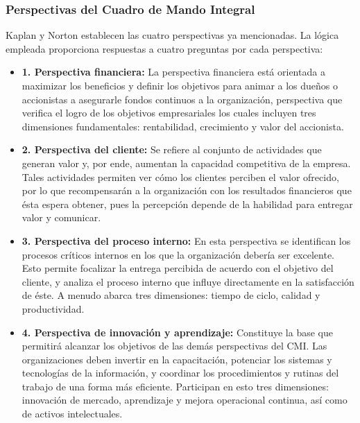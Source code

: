 \documentclass[preprint,12pt]{elsarticle}
\begin{document}
\subsubsection{\textbf{Perspectivas del Cuadro de Mando Integral}}

Kaplan y Norton establecen las cuatro perspectivas ya mencionadas. La lógica empleada proporciona respuestas a cuatro preguntas por cada perspectiva: 

	\begin{itemize}
	\item{\textbf{1. Perspectiva financiera: }} La perspectiva financiera está orientada a maximizar los beneficios y definir los objetivos para animar a los dueños o accionistas a asegurarle fondos continuos a la organización, perspectiva que verifica el logro de los objetivos empresariales los cuales incluyen tres dimensiones fundamentales: rentabilidad, crecimiento y valor del accionista.
	\item {\textbf{2. Perspectiva del cliente: }} Se refiere al conjunto de actividades que generan valor y, por ende, aumentan la capacidad competitiva de la empresa. Tales actividades permiten ver cómo los clientes perciben el valor ofrecido, por lo que recompensarán a la organización con los resultados financieros que ésta espera obtener, pues la percepción depende de la habilidad para entregar valor y comunicar. %
	\item {\textbf{3. Perspectiva del proceso interno: }} En esta perspectiva se identifican los procesos críticos internos en los que la organización debería ser excelente. Esto permite focalizar la entrega percibida de acuerdo con el objetivo del cliente, y analiza el proceso interno que influye directamente en la satisfacción de éste. A menudo abarca tres dimensiones: tiempo de ciclo, calidad y productividad.
	\item {\textbf{4. Perspectiva de innovación y aprendizaje: }} Constituye la base que permitirá alcanzar los objetivos de las demás perspectivas del CMI. Las organizaciones deben invertir en la capacitación, potenciar los sistemas y tecnologías de la información, y coordinar los procedimientos y rutinas del trabajo de una forma más eficiente. Participan en esto tres dimensiones: innovación de mercado, aprendizaje y mejora operacional continua, así como de activos intelectuales.  \cite{referenciaestrella2}

	\end{itemize}
\end{document}
